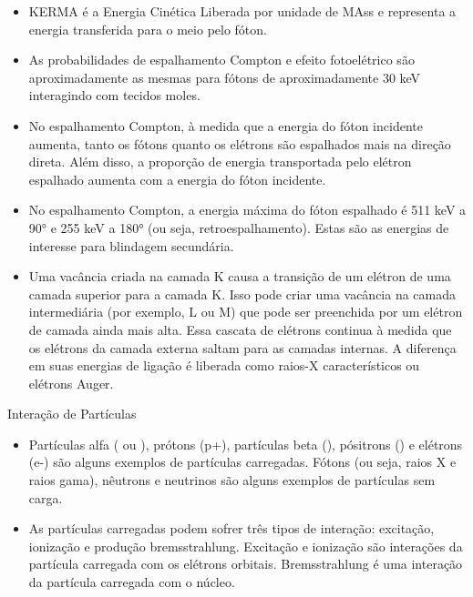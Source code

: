 \documentclass[11pt,a4paper]{article}
\newcounter{exemplo}
\begin{document}
\begin{exemplo}
\begin{itemize}
        \item KERMA é a Energia Cinética Liberada por unidade de MAss e representa a energia transferida para o meio pelo fóton.
        
        \item As probabilidades de espalhamento Compton e efeito fotoelétrico são aproximadamente as mesmas para fótons de aproximadamente 30 keV interagindo com tecidos moles.
        
        \item No espalhamento Compton, à medida que a energia do fóton incidente aumenta, tanto os fótons quanto os elétrons são espalhados mais na direção direta. Além disso, a proporção de energia transportada pelo elétron espalhado aumenta com a energia do fóton incidente.
        
        \item No espalhamento Compton, a energia máxima do fóton espalhado é 511 keV a 90° e 255 keV a 180° (ou seja, retroespalhamento). Estas são as energias de interesse para blindagem secundária.
        
        \item Uma vacância criada na camada K causa a transição de um elétron de uma camada superior para a camada K. Isso pode criar uma vacância na camada intermediária (por exemplo, L ou M) que pode ser preenchida por um elétron de camada ainda mais alta. Essa cascata de elétrons continua à medida que os elétrons da camada externa saltam para as camadas internas. A diferença em suas energias de ligação é liberada como raios-X característicos ou elétrons Auger.
    \end{itemize}

    \textcolor{CarnationPink}{Interação de Partículas}
    \begin{itemize}
        \item Partículas alfa ( ou ), prótons (p+), partículas beta (\ce{\beta-}), pósitrons (\ce{\beta+}) e elétrons (e-) são alguns exemplos de partículas carregadas. Fótons (ou seja, raios X e raios gama), nêutrons e neutrinos são alguns exemplos de partículas sem carga.
        
        \item As partículas carregadas podem sofrer três tipos de interação: excitação, ionização e produção bremsstrahlung. Excitação e ionização são interações da partícula carregada com os elétrons orbitais. Bremsstrahlung é uma interação da partícula carregada com o núcleo.
        

\end{itemize}
\end{exemplo}
\end{document}
